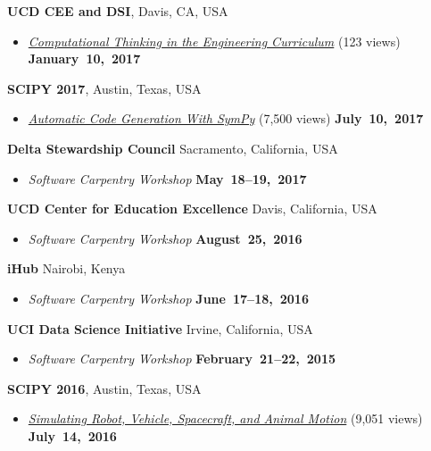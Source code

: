 \documentclass[10pt]{article}
\newenvironment{outerlist}[1][\enskip\textbullet]%
        {\begin{itemize}[#1]}{\end{itemize}%
         \vspace{-.6\baselineskip}}
\newcommand{\blankline}{\quad\pagebreak[2]}
\begin{document}
\blankline

\textbf{UCD CEE and DSI}, Davis, CA, USA
\begin{outerlist}
  \item[] \href{https://youtu.be/lfRVRqdYdjM}{\textit{Computational Thinking in
    the Engineering Curriculum}} (123 views)
    \hfill \textbf{January~10,~2017}
\end{outerlist}

\blankline

\textbf{SCIPY 2017}, Austin, Texas, USA
\begin{outerlist}
  \item[] \href{https://youtu.be/5jzIVp6bTy0}{\textit{Automatic Code Generation
  With SymPy}} (7,500 views)
    \hfill \textbf{July~10,~2017}
\end{outerlist}

\blankline

\textbf{Delta Stewardship Council} Sacramento, California, USA
\begin{outerlist}
  \item[] \textit{Software Carpentry Workshop}
    \hfill \textbf{May~18--19,~2017}
\end{outerlist}

\blankline

\textbf{UCD Center for Education Excellence} Davis, California, USA
\begin{outerlist}
  \item[] \textit{Software Carpentry Workshop}
    \hfill \textbf{August~25,~2016}
\end{outerlist}

\blankline

\textbf{iHub} Nairobi, Kenya
\begin{outerlist}
  \item[] \textit{Software Carpentry Workshop}
    \hfill \textbf{June~17--18,~2016}
\end{outerlist}

\blankline

\textbf{UCI Data Science Initiative} Irvine, California, USA
\begin{outerlist}
  \item[] \textit{ Software Carpentry Workshop}
    \hfill \textbf{February~21--22,~2015}
\end{outerlist}

\blankline

\textbf{SCIPY 2016}, Austin, Texas, USA
\begin{outerlist}
  \item[] \href{https://youtu.be/r4piIKV4sDw}{\textit{Simulating Robot,
    Vehicle, Spacecraft, and Animal Motion}} (9,051 views)
    \hfill \textbf{July~14,~2016}
\end{outerlist}
\end{document}
